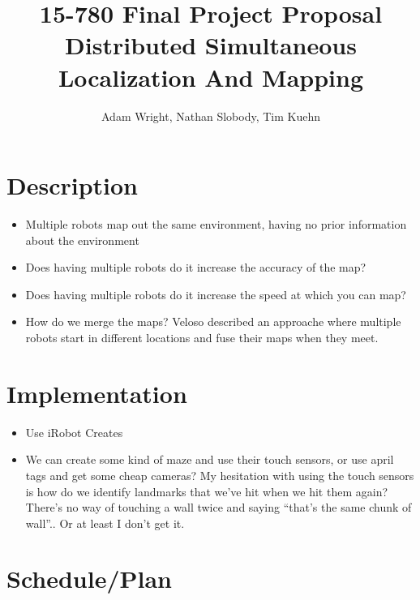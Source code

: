 \documentclass[11pt]{article}
\title{
15-780 Final Project Proposal \\ 
Distributed Simultaneous Localization And Mapping \\
}
\author{Adam Wright, Nathan Slobody, Tim Kuehn}
\begin{document}
\maketitle

\section{Description}

\begin{itemize}
    \item Multiple robots map out the same environment, having no prior information about the environment

    \item Does having multiple robots do it increase the accuracy of the map?

    \item Does having multiple robots do it increase the speed at which you can map?

    \item How do we merge the maps? Veloso described an approache where multiple robots start in different locations and fuse their maps when they meet.
\end{itemize}

\section{Implementation}

\begin{itemize}
    \item Use iRobot Creates

    \item We can create some kind of maze and use their touch sensors, or use april tags and get some cheap cameras? My hesitation with using the touch sensors is how do we identify landmarks that we've hit when we hit them again? There's no way of touching a wall twice and saying ``that's the same chunk of wall''.. Or at least I don't get it.
\end{itemize}

\section{Schedule/Plan}
\end{document}
